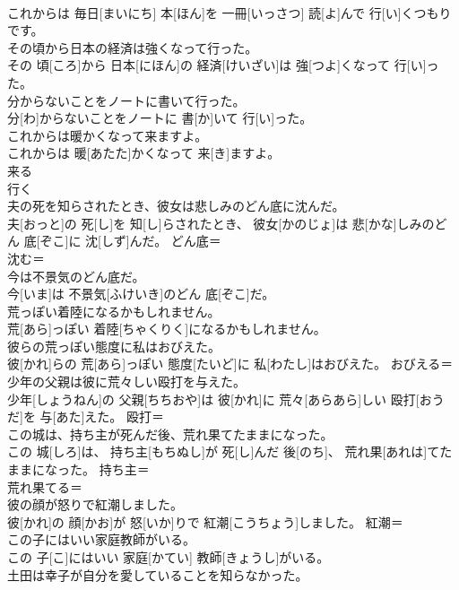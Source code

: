 \documentclass[8pt]{extreport}
\begin{document}
\begin{CJK}{UTF8}{min}
\\	これからは 毎日[まいにち] 本[ほん]を 一冊[いっさつ] 読[よ]んで 行[い]くつもりです。	
\\	その頃から日本の経済は強くなって行った。	
\\	その 頃[ころ]から 日本[にほん]の 経済[けいざい]は 強[つよ]くなって 行[い]った。	
\\	分からないことをノートに書いて行った。	
\\	分[わ]からないことをノートに 書[か]いて 行[い]った。	
\\	これからは暖かくなって来ますよ。	
\\	これからは 暖[あたた]かくなって 来[き]ますよ。	
\\	来る 
\\	行く 
\\	夫の死を知らされたとき、彼女は悲しみのどん底に沈んだ。	
\\	夫[おっと]の 死[し]を 知[し]らされたとき、 彼女[かのじょ]は 悲[かな]しみのどん 底[ぞこ]に 沈[しず]んだ。	どん底＝ 
\\	沈む＝ 
\\	今は不景気のどん底だ。	
\\	今[いま]は 不景気[ふけいき]のどん 底[ぞこ]だ。	
\\	荒っぽい着陸になるかもしれません。	
\\	荒[あら]っぽい 着陸[ちゃくりく]になるかもしれません。	
\\	彼らの荒っぽい態度に私はおびえた。	
\\	彼[かれ]らの 荒[あら]っぽい 態度[たいど]に 私[わたし]はおびえた。	おびえる＝ 
\\	少年の父親は彼に荒々しい殴打を与えた。	
\\	少年[しょうねん]の 父親[ちちおや]は 彼[かれ]に 荒々[あらあら]しい 殴打[おうだ]を 与[あた]えた。	殴打＝ 
\\	この城は、持ち主が死んだ後、荒れ果てたままになった。	
\\	この 城[しろ]は、 持ち主[もちぬし]が 死[し]んだ 後[のち]、 荒れ果[あれは]てたままになった。	持ち主＝ 
\\	荒れ果てる＝ 
\\	彼の顔が怒りで紅潮しました。	
\\	彼[かれ]の 顔[かお]が 怒[いか]りで 紅潮[こうちょう]しました。	紅潮＝ 
\\	この子にはいい家庭教師がいる。	
\\	この 子[こ]にはいい 家庭[かてい] 教師[きょうし]がいる。	
\\	土田は幸子が自分を愛していることを知らなかった。	

\end{CJK}
\end{document}
